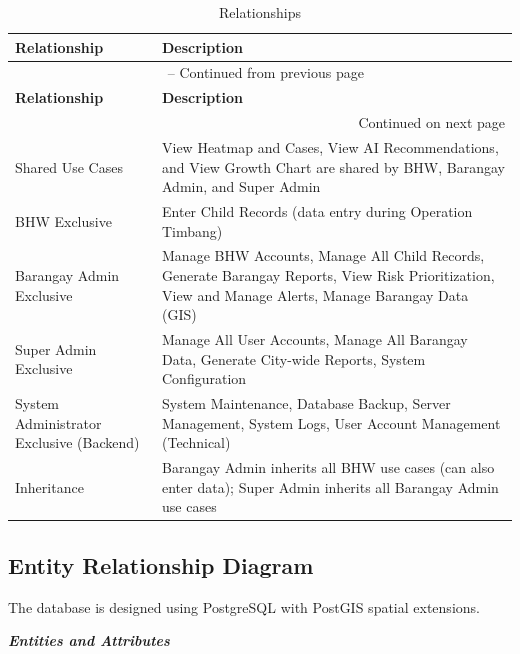 \documentclass[12pt, a4paper]{report}
\begin{document}
\vspace{0.3cm}
\begin{longtable}{p{3.5cm} p{10.5cm}}
    \caption{Relationships} \label{tab:relationships} \\
    \toprule
    \textbf{Relationship} & \textbf{Description} \\
    \midrule
    \endfirsthead
    \multicolumn{2}{c}{{\tablename\ \thetable{} -- Continued from previous page}} \\
    \toprule
    \textbf{Relationship} & \textbf{Description} \\
    \midrule
    \endhead
    \midrule
    \multicolumn{2}{r}{{Continued on next page}} \\
    \endfoot
    \bottomrule
    \endlastfoot
    Shared Use Cases & View Heatmap and Cases, View AI Recommendations, and View Growth Chart are shared by BHW, Barangay Admin, and Super Admin \\
    \addlinespace
    BHW Exclusive & Enter Child Records (data entry during Operation Timbang) \\
    \addlinespace
    Barangay Admin Exclusive & Manage BHW Accounts, Manage All Child Records, Generate Barangay Reports, View Risk Prioritization, View and Manage Alerts, Manage Barangay Data (GIS) \\
    \addlinespace
    Super Admin Exclusive & Manage All User Accounts, Manage All Barangay Data, Generate City-wide Reports, System Configuration \\
    \addlinespace
    System Administrator Exclusive (Backend) & System Maintenance, Database Backup, Server Management, System Logs, User Account Management (Technical) \\
    \addlinespace
    Inheritance & Barangay Admin inherits all BHW use cases (can also enter data); Super Admin inherits all Barangay Admin use cases \\
\end{longtable}
\vspace{0.3cm}

\subsection{Entity Relationship Diagram}
\label{subsec:erd}
The database is designed using PostgreSQL with PostGIS spatial extensions.

\noindent \textbf{\textit{Entities and Attributes}}
\end{document}
